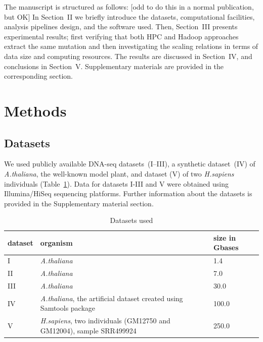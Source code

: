 \documentclass[11pt, oneside]{article}   	%
\newcommand{\COMMENT}[1]{{\color{red} #1 }}
\begin{document}
The manuscript is structured as follows: \COMMENT{[odd to do this in a normal publication, but OK]} In Section~II we briefly introduce the datasets, computational facilities, analysis pipelines design,  and the software used. Then, Section~III presents experimental results; first verifying that both HPC and Hadoop approaches extract the same mutation and then investigating the scaling relations in terms of data size and computing resources. The results are discussed in Section~IV, and conclusions in Section~V. Supplementary materials are provided in the corresponding section.



\section{Methods}
\label{sectionII}

\subsection{Datasets}
We used publicly available DNA-seq datasets~(I--III), a synthetic dataset~(IV) of {\it A.thaliana}, the well-known model plant, and dataset (V) of two {\it H.sapiens} individuals (Table~\ref{table:datasets}). Data for datasets I-III and V were obtained using Illumina/HiSeq sequencing platforms. Further information about the datasets is provided in the Supplementary material section.


\begin{table}[htdp]
\small
\footnotesize
\caption{Datasets used}
\begin{center}
\begin{tabular}{|l|l|l|}
dataset &	organism &	size in Gbases\\
\hline
 I		&	{\it A.thaliana}	&	1.4	\\
 II	&	{\it A.thaliana}	&	7.0\\
  III	&	{\it A.thaliana}	&	30.0	\\
 IV	&{\it A.thaliana}, the artificial dataset created using Samtools package	&	100.0	\\
 V	&	{\it H.sapiens}, two individuals (GM12750 and GM12004), sample SRR499924		&	250.0\\

\end{tabular}
\end{center}
\label{table:datasets}
\normalsize
\end{table}%
\end{document}
